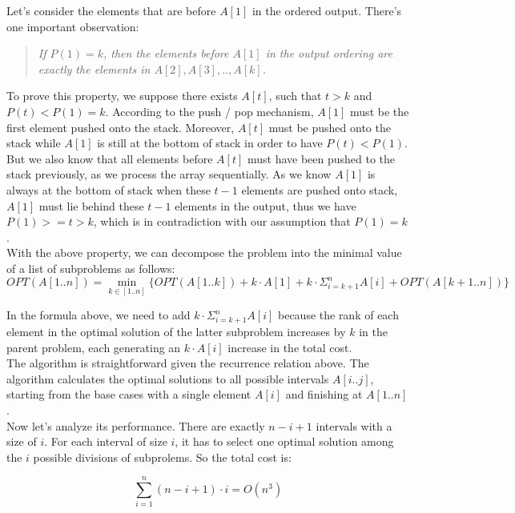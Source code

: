 Let's consider the elements that are before $A[1]$ in the ordered output. There's one important observation:

\begin{quote}
  \textit{If $P(1) = k$, then the elements before $A[1]$ in the output ordering are exactly the elements in $A[2], A[3], .., A[k]$.}
\end{quote}

To prove this property, we suppose there exists $A[t]$, such that $t > k$ and $P(t) < P(1) = k$. According to the push / pop mechanism, $A[1]$ must be the first element pushed onto the stack. Moreover, $A[t]$ must be pushed onto the stack while $A[1]$ is still at the bottom of stack in order to have $P(t) < P(1)$. But we also know that all elements before $A[t]$ must have been pushed to the stack previously, as we process the array sequentially. As we know $A[1]$ is always at the bottom of stack when these $t - 1$ elements are pushed onto stack, $A[1]$ must lie behind these $t - 1$ elements in the output, thus we have $P(1) >= t > k$, which is in contradiction with our assumption that $P(1) = k$.\\

With the above property, we can decompose the problem into the minimal value of a list of subproblems as follows:
\[
OPT(A[1..n]) = \min_{k \in [1..n]} \{ OPT(A[1..k]) + k \cdot A[1] + k \cdot \Sigma_{i = k + 1}^{n}A[i] + OPT(A[k+1..n]) \}
\]

In the formula above, we need to add $k \cdot \Sigma_{i = k + 1}^{n}A[i]$ because the rank of each element in the optimal solution of the latter subproblem increases by $k$ in the parent problem, each generating an $k\cdot A[i]$ increase in the total cost.\\

The algorithm is straightforward given the recurrence relation above. The algorithm calculates the optimal solutions to all possible intervals $A[i..j]$, starting from the base cases with a single element $A[i]$ and finishing at $A[1..n]$.\\
Now let's analyze its performance. There are exactly $n - i + 1$ intervals with a size of $i$. For each interval of size $i$, it has to select one optimal solution among the $i$ possible divisions of subprolems. So the total cost is:

\[
   \sum_{i=1}^{n} (n - i + 1) \cdot i = O(n^3)
\]
